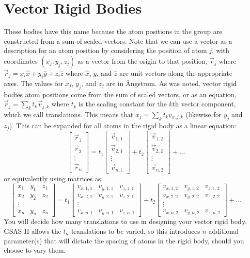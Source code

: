 \section{Vector Rigid Bodies} 
These bodies have this name because the atom positions in the group are constructed from a sum of scaled vectors. Note that we can use a vector as a description for an atom position by considering the position of atom $j$, with coordinates $(x_j,y_j,z_j)$ as a vector from the origin to that position, $\vec{r}_j$ where $\vec{r}_j = x_i\hat{x} + y_i\hat{y} + z_i\hat{z}$ where $\hat{x}$, $\hat{y}$, and $\hat{z}$ are unit vectors along the appropriate axes. The values for $x_j$, $y_j$, and $z_j$ are in Ångstrom. As was noted, vector rigid bodies atom positions come from the sum of scaled vectors, or as an equation, $\vec{r}_j = \sum_k t_k \vec{v}_{j,k}$ where $t_k$ is the scaling constant for the $k$th vector component, which we call translations. This means that $x_j = \sum_k t_k v_{x,j,k}$ (likewise for $y_j$ and $z_j$). This can be expanded for all atoms in the rigid body as a linear equation:
$$
\begin{bmatrix}
\vec{r}_1 \\
\vec{r}_2 \\
\vdots \\
\vec{r}_n
\end{bmatrix}
= 
t_1\begin{bmatrix}
\vec{v}_{1,1} \\
\vec{v}_{2,1} \\
\vdots \\
\vec{v}_{n,1}
\end{bmatrix}
+ 
t_2\begin{bmatrix}
\vec{v}_{1,2} \\
\vec{v}_{2,2} \\
\vdots \\
\vec{v}_{n,2}
\end{bmatrix}
+...
$$
or equivalently using matrices as, 
$$
\begin{bmatrix}
x_1&y_1&z_1 \\
x_2&y_2&z_2  \\
\vdots \\
x_n&y_n&z_n
\end{bmatrix}
= 
t_1\begin{bmatrix}
v_{x,1,1}&v_{y,1,1}&v_{z,1,1} \\
v_{x,2,1}&v_{y,2,1}&v_{z,2,1}  \\
\vdots \\
v_{x,n,1}&v_{y,n,1}&v_{z,n,1}
\end{bmatrix}
+ 
t_2\begin{bmatrix}
v_{x,1,2}&v_{y,1,2}&v_{z,1,2} \\
v_{x,2,2}&v_{y,2,2}&v_{z,2,2}  \\
\vdots \\
v_{x,n,2}&v_{y,n,2}&v_{z,n,2}
\end{bmatrix}
+ ...
$$
You will decide how many translations to use in designing your vector rigid body.  
GSAS-II allows the $t_n$ translations to be varied, so this introduces $n$ additional parameter(s) that will dictate the spacing of atoms in the rigid body, should you choose to vary them. 

